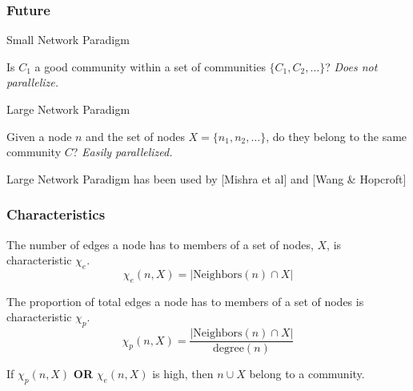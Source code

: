 \documentclass{beamer}
\begin{document}
\begin{frame}\frametitle{Future}
\begin{block}{Small Network Paradigm}
\begin{center}
Is $C_1$ a good community within a set of communities $\{C_1, C_2, \dots\}$? \newline  \newline
{\it Does not parallelize.}
\end{center}
\end{block}
\begin{block}{Large Network Paradigm}
\begin{center}
Given a node $n$ and the set of nodes $X=\{n_1, n_2,\dots \}$, do they belong to the same community $C$? \newline \newline
{\it Easily parallelized.}
\end{center}
\end{block}
Large Network Paradigm has been used by [Mishra et al] and [Wang \& Hopcroft]
\end{frame}

\begin{frame}\frametitle{Characteristics}

\begin{definition}[$\chi_e$]
The number of edges a node has to members of a set of nodes, $X$, is characteristic $\chi_e$.
\begin{equation}
\chi_e(n, X) = |\mbox{Neighbors}(n)\cap X| \nonumber
\end{equation}
\end{definition}


\begin{definition}[$\chi_p$]
The proportion of total edges a node has to members of a set of nodes is characteristic $\chi_p$.
\begin{equation}
\chi_p(n, X) = \frac{|\mbox{Neighbors}(n)\cap X|}{\mbox{degree}(n)} \nonumber
\end{equation}
\end{definition}

If $\chi_p(n, X)$ {\bf OR} $\chi_e(n, X)$ is high, then $n \cup X$ belong to a community.

\end{frame}
\end{document}
